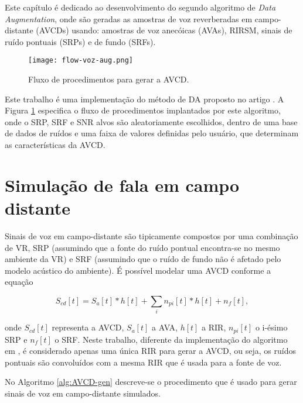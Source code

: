 Este capítulo é dedicado ao desenvolvimento do segundo algoritmo de \textit{Data Augmentation}, onde são geradas as amostras de voz 
reverberadas em campo-distante (AVCDs) usando: amostras de voz anecóicas (AVAs), RIRSM, sinais de ruído pontuais (SRPs) e de fundo (SRFs).

\begin{figure} [H]
    \centering
    \texttt{[image: flow-voz-aug.png]}
    \caption{Fluxo de procedimentos para gerar a AVCD.} 
    \label{fig:flow-voz-rev}
\end{figure}

Este trabalho é uma implementação do método de DA proposto no artigo \cite{Speech_Rec}. A Figura \ref{fig:flow-voz-rev} especifica 
o fluxo de procedimentos implantados por este algoritmo, onde o SRP, SRF e SNR alvos são aleatoriamente escolhidos, 
dentro de uma base de dados de ruídos e uma faixa de valores definidas pelo usuário, que determinam as características da AVCD. 

\section{Simulação de fala em campo distante} 

Sinais de voz em campo-distante são tipicamente compostos por uma combinação de VR, SRP (assumindo que a fonte do ruído pontual encontra-se 
no mesmo ambiente da VR) e SRF (assumindo que o ruído de fundo não é afetado pelo modelo acústico do ambiente).
É possível modelar uma AVCD conforme a equação

\begin{equation} \label{eqn:AVCD-model}
    S_{cd}[t] = S_a[t] \ast h[t] + \sum_i n_{pi}[t] \ast h[t] + n_f[t]
    ,
\end{equation}

\noindent
onde $S_{cd}[t]$ representa a AVCD, $S_a[t]$ a AVA, $h[t]$ a RIR, $n_{pi}[t]$ o i-ésimo SRP e $n_f[t]$ o SRF.
Neste trabalho, diferente da implementação do algoritmo em \cite{Speech_Rec}, é considerado apenas uma única RIR
para gerar a AVCD, ou seja, os ruídos pontuais são convoluídos com a mesma RIR que é usada para a fonte de voz.

No Algoritmo \ref{alg:AVCD-gen} descreve-se o procedimento que é usado para gerar sinais de voz em campo-distante simulados. 
\bigbreak
\bigbreak

